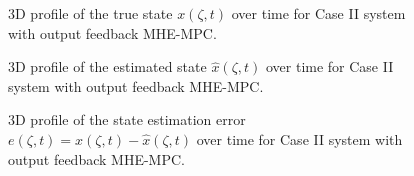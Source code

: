 \begin{figure}[!htbp]
    \centering
    
    \caption{3D profile of the true state $x(\zeta, t)$ over time for Case II system with output feedback MHE-MPC.}
    \label{fig:3_MHE_x_true}
\end{figure}

\begin{figure}[!htbp]
    \centering
    
    \caption{3D profile of the estimated state $\hat{x}(\zeta, t)$ over time for Case II system with output feedback MHE-MPC.}
    \label{fig:3_MHE_x_estimated}
\end{figure}

\begin{figure}[!htbp]
    \centering
    
    \caption{3D profile of the state estimation error $e(\zeta, t) = x(\zeta, t) - \hat{x}(\zeta, t)$ over time for Case II system with output feedback MHE-MPC.}
    \label{fig:3_MHE_err}
\end{figure}